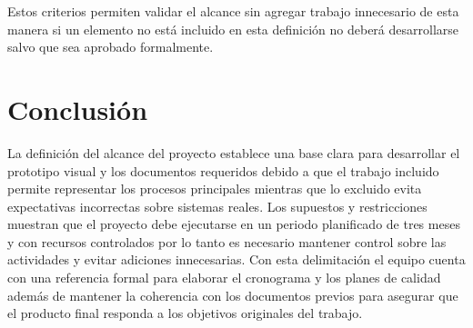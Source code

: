 \documentclass[11pt,spanish]{article}
\begin{document}
Estos criterios permiten validar el alcance sin agregar trabajo innecesario de esta manera si un elemento no está incluido en esta definición no deberá desarrollarse salvo que sea aprobado formalmente.

\section{Conclusión}

La definición del alcance del proyecto establece una base clara para desarrollar el prototipo visual y los documentos requeridos debido a que el trabajo incluido permite representar los procesos principales mientras que lo excluido evita expectativas incorrectas sobre sistemas reales. Los supuestos y restricciones muestran que el proyecto debe ejecutarse en un periodo planificado de tres meses y con recursos controlados por lo tanto es necesario mantener control sobre las actividades y evitar adiciones innecesarias. Con esta delimitación el equipo cuenta con una referencia formal para elaborar el cronograma y los planes de calidad además de mantener la coherencia con los documentos previos para asegurar que el producto final responda a los objetivos originales del trabajo.
\end{document}
